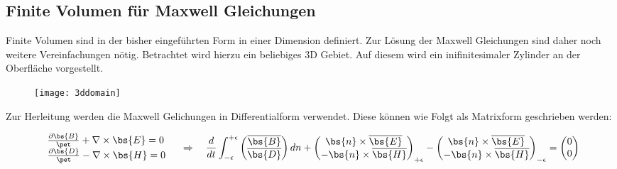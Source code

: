 \subsection{Finite Volumen f\"ur Maxwell Gleichungen}
Finite Volumen sind in der bisher eingef\"uhrten Form in einer Dimension definiert. Zur L\"osung der Maxwell Gleichungen sind daher noch weitere Vereinfachungen n\"otig. Betrachtet wird hierzu ein beliebiges 3D Gebiet. Auf diesem wird ein inifinitesimaler Zylinder an der Oberfl\"ache vorgestellt.
\par
\begin{figure}[ht]
	\centering
	\texttt{[image: 3ddomain]}
\end{figure}
Zur Herleitung werden die Maxwell Gelichungen in Differentialform verwendet. Diese k\"onnen wie Folgt als Matrixform geschrieben werden:
\par
\begin{equation*}
	\begin{array}{l l } \frac{\partial \bs{B}}{\pet} + \nabla \times \bs{E} = 0 \\ \frac{\partial \bs{D}}{\pet} - \nabla \times \bs{H} = 0 \end{array} ~~~ \Rightarrow ~~~ \frac{d}{dt}\int_{-\epsilon}^{+\epsilon}\begin{pmatrix} \overline{\bs{B}} \\ \overline{\bs{D}} \end{pmatrix}dn + \begin{pmatrix} \bs{n} \times \overline{\bs{E}} \\ -\bs{n} \times \overline{\bs{H}} \end{pmatrix}_{+\epsilon} - \begin{pmatrix} \bs{n} \times \overline{\bs{E}} \\ -\bs{n} \times \overline{\bs{H}} \end{pmatrix}_{-\epsilon} = \begin{pmatrix} 0 \\ 0 \end{pmatrix}                                                                                                                                                                                                                                                                                                                                                                                                                                                                                                                                                                                                                                                                                                                                                                                                                                             
\end{equation*}
